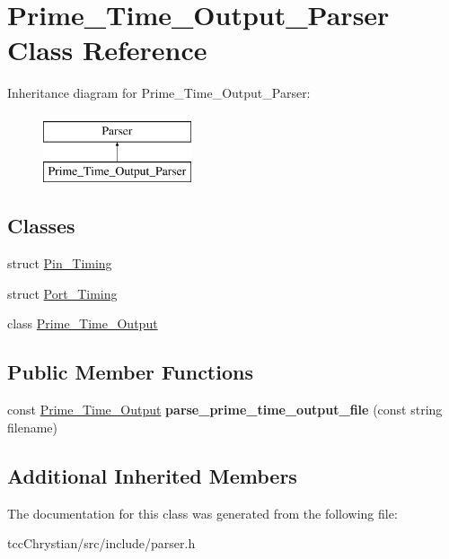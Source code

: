 \hypertarget{classPrime__Time__Output__Parser}{\section{Prime\-\_\-\-Time\-\_\-\-Output\-\_\-\-Parser Class Reference}
\label{classPrime__Time__Output__Parser}
}
Inheritance diagram for Prime\-\_\-\-Time\-\_\-\-Output\-\_\-\-Parser\-:\begin{figure}[H]
\begin{center}
\leavevmode
\includegraphics[height=2.000000cm]{classPrime__Time__Output__Parser}
\end{center}
\end{figure}
\subsection*{Classes}
\begin{DoxyCompactItemize}
\item 
struct \hyperlink{structPrime__Time__Output__Parser_1_1Pin__Timing}{Pin\-\_\-\-Timing}
\item 
struct \hyperlink{structPrime__Time__Output__Parser_1_1Port__Timing}{Port\-\_\-\-Timing}
\item 
class \hyperlink{classPrime__Time__Output__Parser_1_1Prime__Time__Output}{Prime\-\_\-\-Time\-\_\-\-Output}
\end{DoxyCompactItemize}
\subsection*{Public Member Functions}
\begin{DoxyCompactItemize}
\item 
\hypertarget{classPrime__Time__Output__Parser_af43de199ba4575214a4d6e07fb980ca5}{const \hyperlink{classPrime__Time__Output__Parser_1_1Prime__Time__Output}{Prime\-\_\-\-Time\-\_\-\-Output} {\bfseries parse\-\_\-prime\-\_\-time\-\_\-output\-\_\-file} (const string filename)}\label{classPrime__Time__Output__Parser_af43de199ba4575214a4d6e07fb980ca5}

\end{DoxyCompactItemize}
\subsection*{Additional Inherited Members}


The documentation for this class was generated from the following file\-:\begin{DoxyCompactItemize}
\item 
tcc\-Chrystian/src/include/parser.\-h\end{DoxyCompactItemize}
